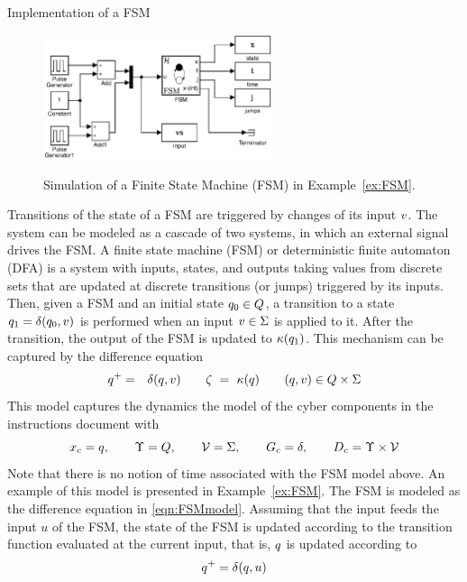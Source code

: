 \begin{example}{Implementation of a FSM}\label{ex:FSM}

\begin{figure}
  \begin{center}
    {\includegraphics[width=0.6\textwidth]{figures/Simulink/FSM_example.eps}}
   \caption{Simulation of a Finite State Machine (FSM) in Example~\ref{ex:FSM}.}
\label{fig:FSM_example}
  \end{center}
\end{figure}

Transitions of the state of a FSM are triggered by changes of its input $v$.
The system can be modeled as a cascade of two systems,
in which an external signal drives the FSM. 
\IfSAE
{
A finite state machine (FSM) or deterministic finite automaton (DFA) is a system with
inputs, states, and outputs taking values from discrete sets that are updated at discrete transitions (or jumps)
triggered by its inputs. 
Then, given a FSM and an initial state $q_0 \in Q$,  
a transition to a state $q_1 = \delta(q_0,v)$ is performed
when an input $v \in \Sigma$ is applied to it.
After the transition, the output of the FSM is updated to $\kappa(q_1)$.
This mechanism can be captured by the difference equation
\begin{eqnarray}\label{eqn:FSMmodel}
\xlogic^+ & = & \delta(\xlogic,\uc)  \qquad \yc \ = \ \hc(\xlogic) \qquad (\xlogic,\uc)  \in \xlogicSpace \times \Sigma
\end{eqnarray}
This model captures the dynamics
the model of the cyber components 
in the instructions document
with
$$
x_c = q, \qquad \Upsilon = Q, \qquad {\cal V} = \Sigma, \qquad G_c = \delta, \qquad D_c = \Upsilon\times{\cal V}
$$
Note that there is no notion of time associated with the FSM model above. An example of this model is presented in Example~\ref{ex:FSM}. 
}
{The FSM is modeled as the difference equation in \eqref{eqn:FSMmodel}.}
Assuming that the input feeds the input $u$ of the FSM, 
the state of the FSM is updated according to the transition function evaluated at the current input, that is,
$q$ is updated according to
 $$
q^+  =  \delta(q,u)
$$


\end{example}
